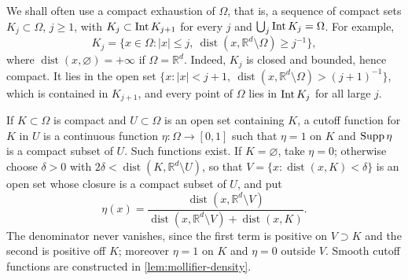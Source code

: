 We shall often use a compact exhaustion of $\Omega$, that is, a sequence of compact sets $K_j\subset\Omega$, $j\geq1$, with $K_j\subset\operatorname{Int} K_{j+1}$ for every $j$ and $\bigcup_j\operatorname{Int} K_j=\Omega$. For example,
\[
 K_j=\{x\in\Omega:|x|\leq j,\ \operatorname{dist}(x,\mathbb R^d\setminus\Omega)\geq j^{-1}\},
\]
where $\operatorname{dist}(x,\varnothing)=+\infty$ if $\Omega=\mathbb R^d$. Indeed, $K_j$ is closed and bounded, hence compact. It lies in the open set $\{x:|x|<j+1,\ \operatorname{dist}(x,\mathbb R^d\setminus\Omega)>(j+1)^{-1}\}$, which is contained in $K_{j+1}$, and every point of $\Omega$ lies in $\operatorname{Int} K_j$ for all large $j$.

If $K\subset\Omega$ is compact and $U\subset\Omega$ is an open set containing $K$, a cutoff function for $K$ in $U$ is a continuous function $\eta\colon\Omega\to[0,1]$ such that $\eta=1$ on $K$ and $\operatorname{Supp}\eta$ is a compact subset of $U$. Such functions exist. If $K=\varnothing$, take $\eta=0$; otherwise choose $\delta>0$ with $2\delta<\operatorname{dist}(K,\mathbb R^d\setminus U)$, so that $V=\{x:\operatorname{dist}(x,K)<\delta\}$ is an open set whose closure is a compact subset of $U$, and put
\[
 \eta(x)=\frac{\operatorname{dist}(x,\mathbb R^d\setminus V)}{\operatorname{dist}(x,\mathbb R^d\setminus V)+\operatorname{dist}(x,K)}.
\]
The denominator never vanishes, since the first term is positive on $V\supset K$ and the second is positive off $K$; moreover $\eta=1$ on $K$ and $\eta=0$ outside $V$. Smooth cutoff functions are constructed in \cref{lem:mollifier-density}.

